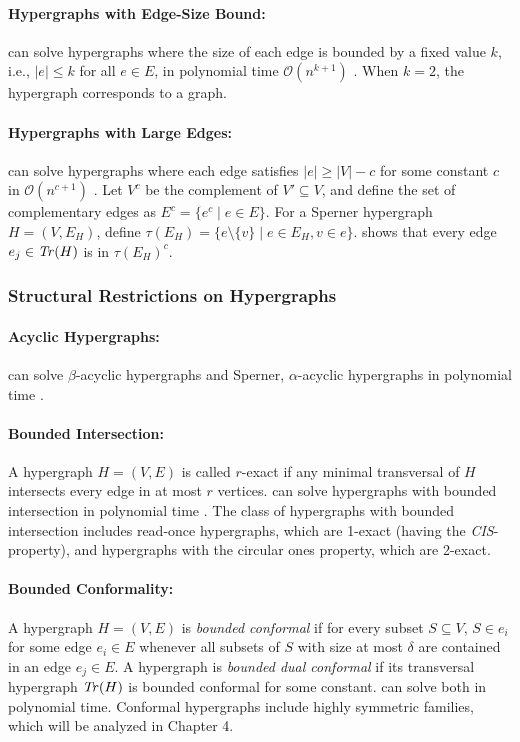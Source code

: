 \paragraph{Hypergraphs with Edge-Size Bound:} \TransHyp{} can solve hypergraphs where the size of each edge is bounded by a fixed value $k$, i.e., $|e|\leq k$ for all $e\in E$, in polynomial time $\mathcal{O}(n^{k+1})$ \cite{BGH98}. When $k=2$, the hypergraph corresponds to a graph.

\paragraph{Hypergraphs with Large Edges:} \TransHyp{} can solve hypergraphs where each edge satisfies $|e|\geq|V|-c$ for some constant $c$ in $\mathcal{O}(n^{c+1})$ \cite{BGH98}. Let $V^c$ be the complement of $V'\subseteq V$, and define the set of complementary edges as $E^c=\{e^c\mid e\in E\}$. For a Sperner hypergraph $H=(V,E_H)$, define $\tau(E_H)=\{e\setminus\{v\}\mid e\in E_H,v\in e\}$. \cite{EG02} shows that every edge $e_j\in\mathit{Tr}(H)$ is in $\tau(E_H)^c$.

\subsubsection*{Structural Restrictions on Hypergraphs}

\paragraph{Acyclic Hypergraphs:} \TransHyp{} can solve $\beta$-acyclic hypergraphs and Sperner, $\alpha$-acyclic hypergraphs in polynomial time \cite{EGM03}.

\paragraph{Bounded Intersection:} A hypergraph $H=(V,E)$ is called $r$-exact if any minimal transversal of $H$ intersects every edge in at most $r$ vertices. \TransHyp{} can solve hypergraphs with bounded intersection in polynomial time \cite{ER10}. The class of hypergraphs with bounded intersection includes read-once hypergraphs, which are 1-exact (having the \emph{CIS}-property), and hypergraphs with the circular ones property, which are 2-exact.

\paragraph{Bounded Conformality:} A hypergraph $H=(V,E)$ is \emph{bounded conformal} if for every subset $S\subseteq V$, $S\in e_i$ for some edge $e_i\in E$ whenever all subsets of $S$ with size at most $\delta$ are contained in an edge $e_j\in E$. A hypergraph is \emph{bounded dual conformal} if its transversal hypergraph $\mathit{Tr}(H)$ is bounded conformal for some constant. \TransHyp{} can solve both in polynomial time. \cite{Hag08} Conformal hypergraphs include highly symmetric families, which will be analyzed in Chapter 4.

